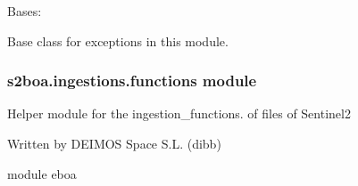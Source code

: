 
\begin{fulllineitems}
\label{\detokenize{s2boa.ingestions:s2boa.ingestions.errors.Error}}
\sphinxAtStartPar
Bases: 

\sphinxAtStartPar
Base class for exceptions in this module.

\end{fulllineitems}



\subsubsection{s2boa.ingestions.functions module}
\label{\detokenize{s2boa.ingestions:module-s2boa.ingestions.functions}}\label{\detokenize{s2boa.ingestions:s2boa-ingestions-functions-module}}
\sphinxAtStartPar
Helper module for the ingestion\_functions. of files of Sentinel\sphinxhyphen{}2

\sphinxAtStartPar
Written by DEIMOS Space S.L. (dibb)

\sphinxAtStartPar
module eboa

